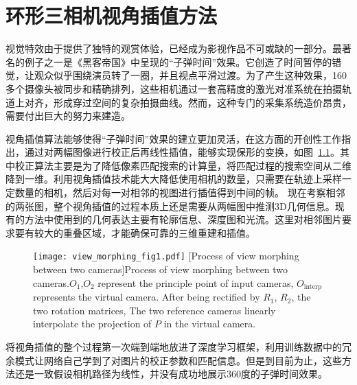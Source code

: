 \chapter{环形三相机视角插值方法}\label{chap:CVM_method}
视觉特效由于提供了独特的观赏体验，已经成为影视作品不可或缺的一部分。最著名的例子之一是《黑客帝国》中呈现的“子弹时间”效果。它创造了时间暂停的错觉，让观众似乎围绕演员转了一圈，并且视点平滑过渡。为了产生这种效果，160多个摄像头被同步和精确排列，这些相机通过一套高精度的激光对准系统在拍摄轨道上对齐，形成穿过空间的复杂拍摄曲线。然而，这种专门的采集系统造价昂贵，需要付出巨大的努力来建造。

视角插值算法能够使得“子弹时间”效果的建立更加灵活，\citet{seitz1996}在这方面的开创性工作指出，通过对两幅图像进行校正后再线性插值，能够实现保形的变换，如图~\ref{fig:view_morphing}。其中校正算法主要是为了降低像素匹配搜索的计算量，将匹配过程的搜索空间从二维降到一维。利用视角插值技术能大大降低使用相机的数量，只需要在轨迹上采样一定数量的相机，然后对每一对相邻的视图进行插值得到中间的帧。
现在考察相邻的两张图，整个视角插值的过程本质上还是需要从两幅图中推测3D几何信息。现有的方法中使用到的几何表达主要有轮廓信息、深度图和光流。这里对相邻图片要求要有较大的重叠区域，才能确保可靠的三维重建和插值。
\begin{figure}[!htbp]
    \centering
    \texttt{[image: view\_morphing\_fig1.pdf]}
    [Process of view morphing between two cameras]{Process of view morphing between two cameras.$O_1$,$O_2$ represent the principle point of input cameras, $O_{\mathrm{interp}}$ represents the virtual camera. After being rectified by $R_1$, $R_2$, the two rotation matrices,  The two reference cameras linearly interpolate the projection of $P$ in the virtual camera.}
    \label{fig:view_morphing}
\end{figure}
\citet{Ji_2017_CVPR}将视角插值的整个过程第一次端到端地放进了深度学习框架，利用训练数据中的冗余模式让网络自己学到了对图片的校正参数和匹配信息。但是到目前为止，这些方法还是一致假设相机路径为线性，并没有成功地展示360度的子弹时间效果。

